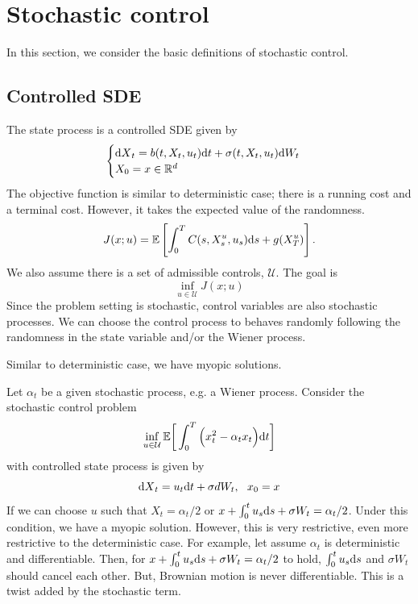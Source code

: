 \documentclass[11pt]{book}
\newcommand{\dt}{\text{\normalfont d}t}
\newcommand{\ds}{\text{\normalfont d}s}
\newcommand{\dX}{\text{\normalfont d}X}
\newcommand{\dW}{\text{\normalfont d}W}
\begin{document}
\section{Stochastic control}
In this section, we consider the basic definitions of  stochastic control.
\subsection{Controlled SDE}
The state process is a controlled SDE given by
\begin{equation}\label{eqn:state_process}
	\begin{cases}
	    {\dX}_t =b(t,X_t,u_t){{\dt}}+\sigma(t,X_t,u_t)\dW_t\\
     X_0=x\in\mathbb{R}^d
	\end{cases}
\end{equation}
The objective function is similar to deterministic case; there is a running cost and a terminal cost. However, it takes the expected value of the randomness.
\begin{equation}
J(x;u)=\mathbb{E}\left[\int_0^T C(s,X_s^u,u_s){{\ds}}+g(X_T^u)\right].
\end{equation}
We also assume there is a set of admissible controls, $\mathcal{U}$. The goal is
\[
\inf_{u\in\mathcal{U}}J(x;u)
\]
Since the problem setting is stochastic, control variables are also stochastic processes. We can choose the control process to behaves randomly following the randomness in the state variable and/or the Wiener process.

Similar to deterministic case, we have myopic solutions. 
\begin{eg}
Let $\alpha_t$ be a given stochastic process, e.g. a Wiener process. Consider the stochastic control problem
    \begin{equation}\label{simple_stoch_control}
        \inf_{u\in\mathcal{U}}\mathbb{E}\bigg[\int_0^T\Big(x_t^2 - \alpha_t x_t\Big) {\dt}\bigg]
    \end{equation}
with controlled state process is given by
\begin{equation}\label{dynamic_SDE_x}
    {\dX}_t =  u_t {{\dt}}+\sigma dW_t, ~~ x_0=x
\end{equation}
If we can choose $u$ such that $X_t=\alpha_t/2$ or $x+\int_0^tu_s\ds+\sigma W_t=\alpha_t/2$. Under this condition, we have a myopic solution. However, this is very restrictive, even more restrictive to the deterministic case. For example, let assume $\alpha_t$ is deterministic and differentiable. Then, for $x+\int_0^tu_s\ds+\sigma W_t=\alpha_t/2$ to hold, $\int_0^tu_s\ds$ and $\sigma W_t$ should cancel each other. But, Brownian motion is never differentiable. This is a twist added by the stochastic term.
\end{eg}
\end{document}
